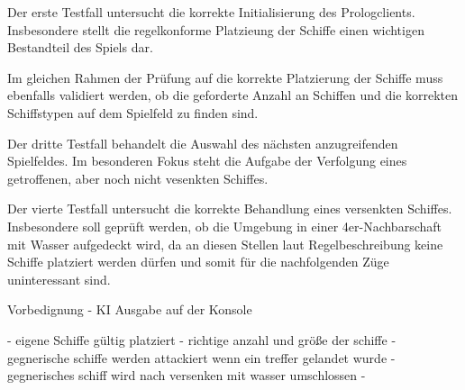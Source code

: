 	Der erste Testfall untersucht die korrekte Initialisierung des Prologclients. Insbesondere stellt die regelkonforme Platzieung der
	Schiffe einen wichtigen Bestandteil des Spiels dar. 
	
	Im gleichen Rahmen der Prüfung auf die korrekte Platzierung der Schiffe muss ebenfalls validiert werden, ob die geforderte Anzahl an Schiffen und die
	korrekten Schiffstypen auf dem Spielfeld zu finden sind.
	
	Der dritte Testfall behandelt die Auswahl des nächsten anzugreifenden Spielfeldes. Im besonderen Fokus steht die Aufgabe der Verfolgung eines 
	getroffenen, aber noch nicht vesenkten Schiffes.
	
	Der vierte Testfall untersucht die korrekte Behandlung eines versenkten Schiffes. Insbesondere soll geprüft werden, ob die Umgebung in einer 4er-Nachbarschaft
	mit Wasser aufgedeckt wird, da an diesen Stellen laut Regelbeschreibung keine Schiffe platziert werden dürfen und somit für die nachfolgenden Züge uninteressant sind.
	
	Vorbedignung - KI Ausgabe auf der Konsole
	
	- eigene Schiffe gültig platziert
	- richtige anzahl und größe der schiffe
	- gegnerische schiffe werden attackiert wenn ein treffer gelandet wurde
	- gegnerisches schiff wird nach versenken mit wasser umschlossen
	- 